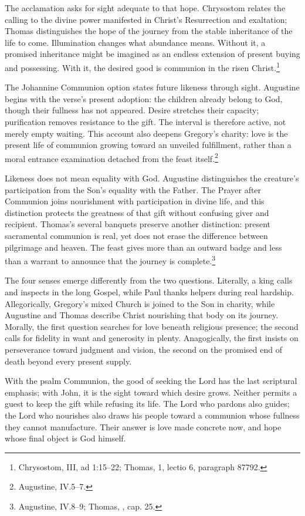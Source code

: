 The acclamation asks for sight adequate to that hope. Chrysostom relates the calling to the divine power manifested in Christ's Resurrection and exaltation; Thomas distinguishes the hope of the journey from the stable inheritance of the life to come. Illumination changes what abundance means. Without it, a promised inheritance might be imagined as an endless extension of present buying and possessing. With it, the desired good is communion in the risen Christ.\footnote{Chrysostom,  III, ad 1:15--22; Thomas,  1, lectio 6, paragraph 87792.}

The Johannine Communion option states future likeness through sight. Augustine begins with the verse's present adoption: the children already belong to God, though their fullness has not appeared. Desire stretches their capacity; purification removes resistance to the gift. The interval is therefore active, not merely empty waiting. This account also deepens Gregory's charity: love is the present life of communion growing toward an unveiled fulfillment, rather than a moral entrance examination detached from the feast itself.\footnote{Augustine,  IV.5--7.}

Likeness does not mean equality with God. Augustine distinguishes the creature's participation from the Son's equality with the Father. The Prayer after Communion joins nourishment with participation in divine life, and this distinction protects the greatness of that gift without confusing giver and recipient. Thomas's several banquets preserve another distinction: present sacramental communion is real, yet does not erase the difference between pilgrimage and heaven. The feast gives more than an outward badge and less than a warrant to announce that the journey is complete.\footnote{Augustine,  IV.8--9; Thomas, , cap. 25.}

The four senses emerge differently from the two questions. Literally, a king calls and inspects in the long Gospel, while Paul thanks helpers during real hardship. Allegorically, Gregory's mixed Church is joined to the Son in charity, while Augustine and Thomas describe Christ nourishing that body on its journey. Morally, the first question searches for love beneath religious presence; the second calls for fidelity in want and generosity in plenty. Anagogically, the first insists on perseverance toward judgment and vision, the second on the promised end of death beyond every present supply.

With the psalm Communion, the good of seeking the Lord has the last scriptural emphasis; with John, it is the sight toward which desire grows. Neither permits a guest to keep the gift while refusing its life. The Lord who pardons also guides; the Lord who nourishes also draws his people toward a communion whose fullness they cannot manufacture. Their answer is love made concrete now, and hope whose final object is God himself.
